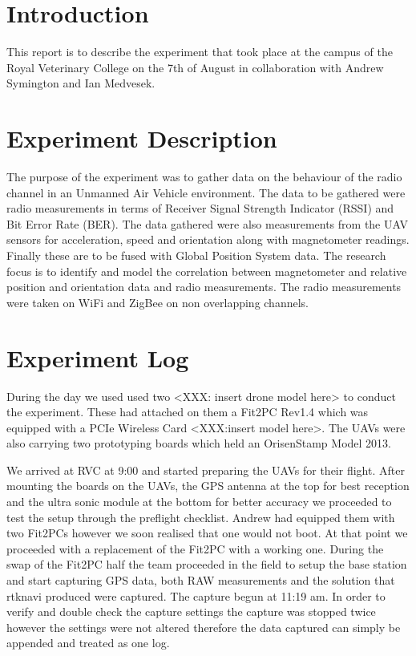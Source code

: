 





\section{Introduction}

This report is to describe the experiment that took place at the campus of the
Royal Veterinary College on the 7th of August in collaboration with Andrew
Symington and Ian Medvesek.


\section{Experiment Description}
The purpose of the experiment was to gather data on the behaviour of the radio
channel in an Unmanned Air Vehicle environment. The data to be gathered were
radio measurements in terms of Receiver Signal Strength Indicator (RSSI) and Bit
Error Rate (BER). The data gathered were also measurements from the UAV sensors
for acceleration, speed and orientation along with magnetometer readings.
Finally these are to be fused with Global Position System data. The research
focus is to identify and model the correlation between magnetometer and relative
position and orientation data and radio measurements. The radio measurements
were taken on WiFi and ZigBee on non overlapping channels.

\section{Experiment Log}
During the day we used used two <XXX: insert drone model here> to conduct the
experiment. These had attached on them a Fit2PC Rev1.4 which was equipped with a
PCIe Wireless Card <XXX:insert model here>. The UAVs were also carrying two
prototyping boards which held an OrisenStamp Model 2013.

We arrived at RVC at 9:00 and started preparing the UAVs for their flight.
After mounting the boards on the UAVs, the GPS antenna at the top for best
reception and the ultra sonic module at the bottom for better accuracy we
proceeded to test the setup through the preflight checklist. Andrew had equipped
them with two Fit2PCs however we soon realised that one would not boot. At that
point we proceeded with a replacement of the Fit2PC with a working one. During
the swap of the Fit2PC half the team proceeded in the field to setup the base
station and start capturing GPS data, both RAW measurements and the solution
that rtknavi produced were captured. The capture begun at 11:19 am. In order to
verify and double check the capture settings the capture was stopped twice
however the settings were not altered therefore the data captured can simply be
appended and treated as one log.

